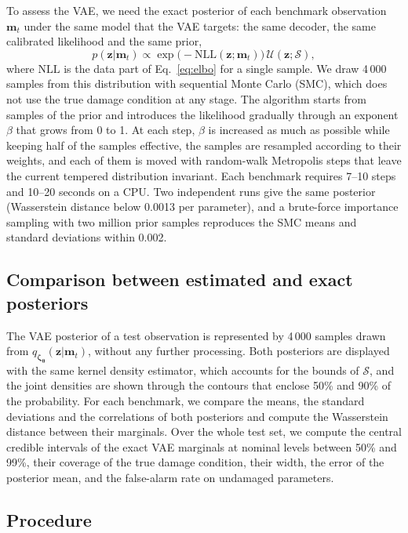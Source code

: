 \documentclass[11pt]{article}
\newcommand{\m}{\mathbf{m}}
\newcommand{\z}{\mathbf{z}}
\begin{document}
To assess the VAE, we need the exact posterior of each benchmark observation $\m_t$ under the same model that the VAE
targets: the same decoder, the same calibrated likelihood and the same prior,
\begin{equation}
p(\z|\m_t)\propto\exp\!\big(-\mathrm{NLL}(\z;\m_t)\big)\,\mathcal{U}(\z;\mathcal{S}),
\end{equation}
where $\mathrm{NLL}$ is the data part of Eq.~\eqref{eq:elbo} for a single sample. We draw 4\,000 samples from this
distribution with sequential Monte Carlo (SMC), which does not use the true damage condition at any stage. The
algorithm starts from samples of the prior and introduces the likelihood gradually through an exponent $\beta$ that
grows from 0 to 1. At each step, $\beta$ is increased as much as possible while keeping half of the samples effective,
the samples are resampled according to their weights, and each of them is moved with random-walk Metropolis steps that
leave the current tempered distribution invariant. Each benchmark requires 7--10 steps and 10--20 seconds on a
CPU. Two independent runs give the same posterior (Wasserstein distance below 0.0013 per parameter), and a
brute-force importance sampling with two million prior samples reproduces the SMC means and standard deviations within
0.002.

\subsection{Comparison between estimated and exact posteriors}

The VAE posterior of a test observation is represented by 4\,000 samples drawn from $q_{\bm\zeta_{\bm\theta}}(\z|\m_t)$,
without any further processing. Both posteriors are displayed with the same kernel density estimator, which accounts
for the bounds of $\mathcal{S}$, and the joint densities are shown through the contours that enclose 50\% and 90\% of
the probability. For each benchmark, we compare the means, the standard deviations and the correlations of both
posteriors and compute the Wasserstein distance between their marginals. Over the whole test set, we compute the
central credible intervals of the exact VAE marginals at nominal levels between 50\% and 99\%, their coverage of the
true damage condition, their width, the error of the posterior mean, and the false-alarm rate on undamaged parameters.

\subsection{Procedure}
\end{document}
